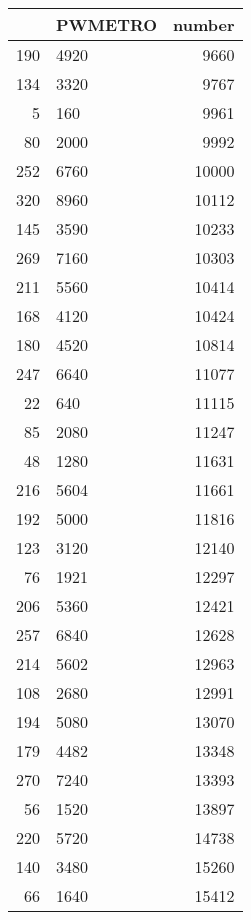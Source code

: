 \begin{table}[ht]
\centering
\begin{tabular}{rlr}
  \hline
 & PWMETRO & number \\ 
  \hline
190 & 4920 & 9660 \\ 
  134 & 3320 & 9767 \\ 
  5 & 160 & 9961 \\ 
  80 & 2000 & 9992 \\ 
  252 & 6760 & 10000 \\ 
  320 & 8960 & 10112 \\ 
  145 & 3590 & 10233 \\ 
  269 & 7160 & 10303 \\ 
  211 & 5560 & 10414 \\ 
  168 & 4120 & 10424 \\ 
  180 & 4520 & 10814 \\ 
  247 & 6640 & 11077 \\ 
  22 & 640 & 11115 \\ 
  85 & 2080 & 11247 \\ 
  48 & 1280 & 11631 \\ 
  216 & 5604 & 11661 \\ 
  192 & 5000 & 11816 \\ 
  123 & 3120 & 12140 \\ 
  76 & 1921 & 12297 \\ 
  206 & 5360 & 12421 \\ 
  257 & 6840 & 12628 \\ 
  214 & 5602 & 12963 \\ 
  108 & 2680 & 12991 \\ 
  194 & 5080 & 13070 \\ 
  179 & 4482 & 13348 \\ 
  270 & 7240 & 13393 \\ 
  56 & 1520 & 13897 \\ 
  220 & 5720 & 14738 \\ 
  140 & 3480 & 15260 \\ 
  66 & 1640 & 15412 \\ 
   \hline
\end{tabular}
\end{table}
